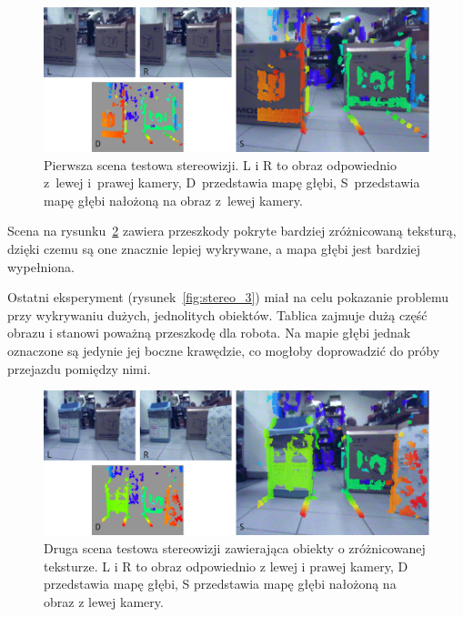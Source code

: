 \begin{figure}[h!]
\centering
\includegraphics{../img/stereo_1}
\caption[Pierwsza scena testowa stereowizji]{Pierwsza scena testowa stereowizji. L i R to obraz odpowiednio z~lewej i~prawej kamery, D~przedstawia mapę głębi, S~przedstawia mapę głębi nałożoną na obraz z~lewej kamery.}
\label{fig:stereo_1}
\end{figure}

Scena na rysunku~\ref{fig:stereo_2} zawiera przeszkody pokryte bardziej zróżnicowaną
teksturą, dzięki czemu są one znacznie lepiej wykrywane, a mapa głębi jest bardziej
wypełniona.

Ostatni eksperyment (rysunek~\ref{fig:stereo_3}) miał na celu pokazanie problemu
przy wykrywaniu dużych, jednolitych obiektów. Tablica zajmuje dużą część obrazu
i stanowi poważną przeszkodę dla robota. Na mapie głębi jednak oznaczone są jedynie
jej boczne krawędzie, co mogłoby doprowadzić do próby przejazdu pomiędzy nimi.

\begin{figure}[h!]
\centering
\includegraphics{../img/stereo_2}
\caption[Druga scena testowa stereowizji]{Druga scena testowa stereowizji zawierająca obiekty o zróżnicowanej teksturze. L i R to obraz odpowiednio z lewej i prawej kamery, D przedstawia mapę głębi, S przedstawia mapę głębi nałożoną na obraz z lewej kamery.}
\label{fig:stereo_2}
\end{figure}


